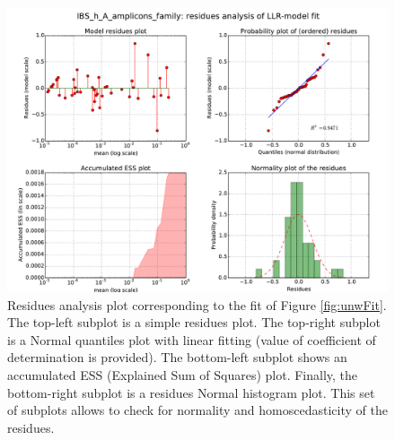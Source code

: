 \begin{figure}
	\centering
	\includegraphics[width=\textwidth]{results/fits/IBS_h_A_amplicons_family_stdVSmean_LLR_RES.pdf}
	\caption{Residues analysis plot corresponding to the fit of Figure \ref{fig:unwFit}. The top-left subplot is a simple residues plot. The top-right subplot is a Normal quantiles plot with linear fitting (value of coefficient of determination is provided). The bottom-left subplot shows an accumulated ESS (Explained Sum of Squares) plot. Finally, the bottom-right subplot is a residues Normal histogram plot. This set of subplots allows to check for normality and homoscedasticity of the residues.}
	\label{fig:unwRes}
\end{figure}

